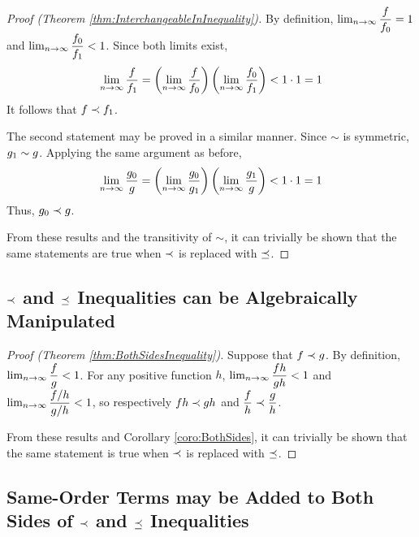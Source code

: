 \begin{proof}[Proof (Theorem \ref{thm:InterchangeableInInequality})]
	By definition, $\lim_{n \to \infty} \dfrac{f}{f_0} = 1$ and $\lim_{n \to \infty} \dfrac{f_0}{f_1} < 1$. Since both limits exist,
	\begin{align*}
	\lim_{n \to \infty} \frac{f}{f_1} = \left( \lim_{n \to \infty} \frac{f}{f_0} \right) \left( \lim_{n \to \infty} \frac{f_0}{f_1} \right) < 1 \cdot 1 = 1
	\end{align*}
	It follows that $f \prec f_1$.
	
	The second statement may be proved in a similar manner. Since $\sim$ is symmetric, $g_1 \sim g$. Applying the same argument as before,
	\begin{align*}
	\lim_{n \to \infty} \frac{g_0}{g} = \left( \lim_{n \to \infty} \frac{g_0}{g_1} \right) \left( \lim_{n \to \infty} \frac{g_1}{g} \right) < 1 \cdot 1 = 1
	\end{align*}
	Thus, $g_0 \prec g$.
	
	From these results and the transitivity of $\sim$, it can trivially be shown that the same statements are true when $\prec$ is replaced with $\preceq$.
\end{proof}

\subsection{$\prec$ and $\preceq$ Inequalities can be Algebraically Manipulated}

\begin{proof}[Proof (Theorem \ref{thm:BothSidesInequality})]
	Suppose that $f \prec g$. By definition, $\lim_{n \to \infty} \dfrac{f}{g} < 1$. For any positive function $h$, $\lim_{n \to \infty} \dfrac{fh}{gh} < 1$ and $\lim_{n \to \infty} \dfrac{f / h}{g / h} < 1$, so respectively $fh \prec gh$ and $\dfrac{f}{h} \prec \dfrac{g}{h}$.
	
	From these results and Corollary \ref{coro:BothSides}, it can trivially be shown that the same statement is true when $\prec$ is replaced with $\preceq$.
\end{proof}

\subsection{Same-Order Terms may be Added to Both Sides of $\prec$ and $\preceq$ Inequalities}

